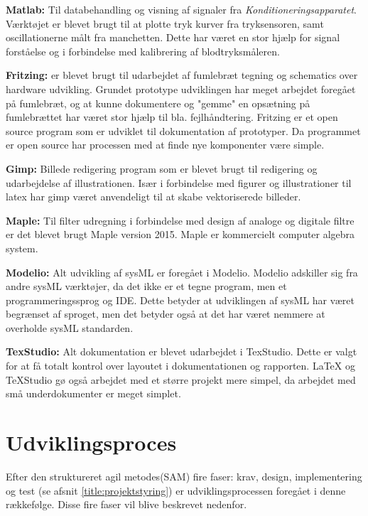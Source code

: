 \textbf{Matlab:} Til databehandling og visning af signaler fra \textit{Konditioneringsapparatet}. Værktøjet er blevet brugt til at plotte tryk kurver fra tryksensoren, samt oscillationerne målt fra manchetten. Dette har været en stor hjælp for signal forståelse og i forbindelse med kalibrering af blodtryksmåleren. 

\textbf{Fritzing:} er blevet brugt til udarbejdet af fumlebræt tegning og schematics over hardware udvikling. Grundet prototype udviklingen har meget arbejdet foregået på fumlebræt, og at kunne dokumentere og "gemme" en opsætning på fumlebrættet har været stor hjælp til bla. fejlhåndtering. Fritzing er et open source program som er udviklet til dokumentation af prototyper. Da programmet er open source har processen med at finde nye komponenter være simple. 

\textbf{Gimp:} Billede redigering program som er blevet brugt til redigering og udarbejdelse af illustrationen. Især i forbindelse med figurer og illustrationer til latex har gimp været anvendeligt til at skabe vektoriserede billeder. 

\textbf{Maple:} Til filter udregning i forbindelse med design af analoge og digitale filtre er det blevet brugt Maple version 2015. Maple er kommercielt computer algebra system. 

\textbf{Modelio:} Alt udvikling af sysML er foregået i Modelio. Modelio adskiller sig fra andre sysML værktøjer, da det ikke er et tegne program, men et programmeringssprog og IDE. Dette betyder at udviklingen af sysML har været begrænset af sproget, men det betyder også at det har været nemmere at overholde sysML standarden. 

\textbf{TexStudio:} Alt dokumentation er blevet udarbejdet i TexStudio. Dette er valgt for at få totalt kontrol over layoutet i dokumentationen og rapporten. LaTeX og TeXStudio gø også arbejdet med et større projekt mere simpel, da arbejdet med små underdokumenter er meget simplet. 


\section{Udviklingsproces} \label{title:udviklingMetode}
Efter den struktureret agil metodes(SAM) fire faser: krav, design, implementering og test (se afsnit \ref{title:projektstyring}) er udviklingsprocessen foregået i denne rækkefølge. Disse fire faser vil blive beskrevet nedenfor.

